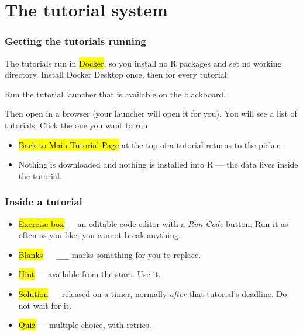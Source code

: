 \documentclass[slidestop,compress,mathserif]{beamer}
\begin{document}
\section{The tutorial system}
\begin{frame}[fragile]
\frametitle{Getting the tutorials running}

The tutorials run in \hl{Docker}, so you install no R packages and set no
working directory. Install Docker Desktop once, then for every tutorial:

Run the tutorial launcher that is available on the blackboard. 

Then open  in a browser (your launcher will open it for you). 
You will see a list of tutorials. Click the one you want to run.

\vspace{0.4em}
\begin{itemize}\footnotesize
  \item \hl{Back to Main Tutorial Page} at the top of a tutorial returns
        to the picker.
  \item Nothing is downloaded and nothing is installed into R --- the
        data lives inside the tutorial.
\end{itemize}

\end{frame}
\begin{frame}
\frametitle{Inside a tutorial}

\begin{itemize}
  \item \hl{Exercise box} --- an editable code editor with a
        \emph{Run Code} button. Run it as often as you like; you cannot
        break anything.
  \item \hl{Blanks} --- \texttt{\_\_\_} marks something for you to
        replace.
  \item \hl{Hint} --- available from the start. Use it.
  \item \hl{Solution} --- released on a timer, normally \emph{after}
        that tutorial's deadline. Do not wait for it.
  \item \hl{Quiz} --- multiple choice, with retries.
\end{itemize}


\end{frame}
\end{document}
